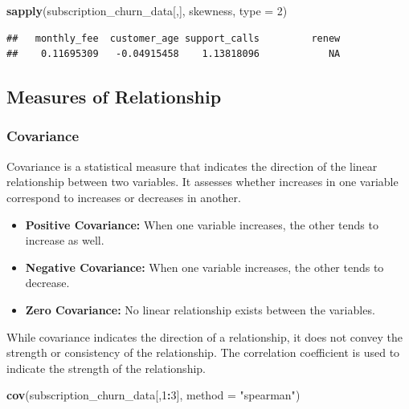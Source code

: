 \documentclass[
]{article}
\newenvironment{Shaded}{\begin{snugshade}}{\end{snugshade}}
\newcommand{\AttributeTok}[1]{\textcolor[rgb]{0.13,0.29,0.53}{#1}}
\newcommand{\DecValTok}[1]{\textcolor[rgb]{0.00,0.00,0.81}{#1}}
\newcommand{\FunctionTok}[1]{\textcolor[rgb]{0.13,0.29,0.53}{\textbf{#1}}}
\newcommand{\NormalTok}[1]{#1}
\newcommand{\SpecialCharTok}[1]{\textcolor[rgb]{0.81,0.36,0.00}{\textbf{#1}}}
\newcommand{\StringTok}[1]{\textcolor[rgb]{0.31,0.60,0.02}{#1}}
\begin{document}
\begin{Shaded}
\begin{Highlighting}[]
\FunctionTok{sapply}\NormalTok{(subscription\_churn\_data[,], skewness, }\AttributeTok{type =} \DecValTok{2}\NormalTok{)}
\end{Highlighting}
\end{Shaded}

\begin{verbatim}
##   monthly_fee  customer_age support_calls         renew 
##    0.11695309   -0.04915458    1.13818096            NA
\end{verbatim}

\subsection{Measures of Relationship}\label{measures-of-relationship}

\subsubsection{Covariance}\label{covariance}

Covariance is a statistical measure that indicates the direction of the
linear relationship between two variables. It assesses whether increases
in one variable correspond to increases or decreases in
another.\hspace{0pt}

\begin{itemize}
\item
  \textbf{Positive Covariance:} When one variable increases, the other
  tends to increase as well.
\item
  \textbf{Negative Covariance:} When one variable increases, the other
  tends to decrease.
\item
  \textbf{Zero Covariance:} No linear relationship exists between the
  variables.
\end{itemize}

While covariance indicates the direction of a relationship, it does not
convey the strength or consistency of the relationship. The correlation
coefficient is used to indicate the strength of the relationship.

\begin{Shaded}
\begin{Highlighting}[]
\FunctionTok{cov}\NormalTok{(subscription\_churn\_data[,}\DecValTok{1}\SpecialCharTok{:}\DecValTok{3}\NormalTok{], }\AttributeTok{method =} \StringTok{"spearman"}\NormalTok{)}
\end{Highlighting}
\end{Shaded}
\end{document}
